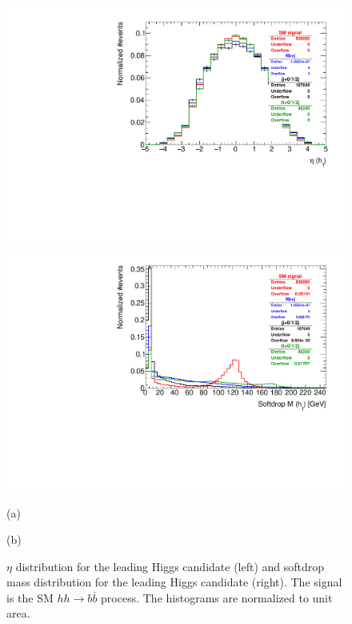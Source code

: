 \begin{figure}
	\centering
	\begin{minipage}{.5\textwidth}
		\centering
		\includegraphics[trim={.65cm 0 0 0},clip,width=\linewidth]{./Figures/hist_h1_eta.pdf}
	\end{minipage}%
	\begin{minipage}{.5\textwidth}
		\centering
		\includegraphics[trim={0 0 .65cm 0},clip,width=\linewidth]{./Figures/hist_h1_softdrop_M.pdf}
	\end{minipage}
	\begin{minipage}[t]{0.5\textwidth}
		\caption*{(a)}
	\end{minipage}%
	\hfill
	\begin{minipage}[t]{0.5\textwidth}
		\caption*{(b)}
	\end{minipage}
	\caption{$\eta$ distribution for the leading Higgs candidate (left) and softdrop mass distribution for the leading Higgs candidate (right). The signal is the SM $hh\rightarrow b\overline{b}$ process. The histograms are normalized to unit area.}
	\label{fig:h1_eta_M}
\end{figure}	

